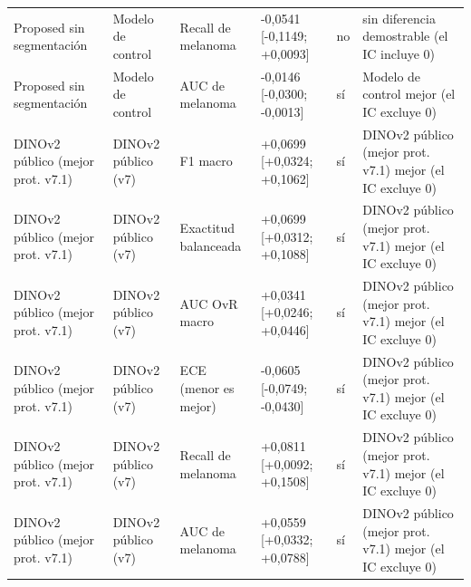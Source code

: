 \begin{longtable}{@{}llllll@{}}
Proposed sin segmentación & Modelo de control & Recall de melanoma & -0,0541 [-0,1149; +0,0093] & no & sin diferencia demostrable (el IC incluye 0) \\
Proposed sin segmentación & Modelo de control & AUC de melanoma & -0,0146 [-0,0300; -0,0013] & sí & Modelo de control mejor (el IC excluye 0) \\
DINOv2 público (mejor prot. v7.1) & DINOv2 público (v7) & F1 macro & +0,0699 [+0,0324; +0,1062] & sí & DINOv2 público (mejor prot. v7.1) mejor (el IC excluye 0) \\
DINOv2 público (mejor prot. v7.1) & DINOv2 público (v7) & Exactitud balanceada & +0,0699 [+0,0312; +0,1088] & sí & DINOv2 público (mejor prot. v7.1) mejor (el IC excluye 0) \\
DINOv2 público (mejor prot. v7.1) & DINOv2 público (v7) & AUC OvR macro & +0,0341 [+0,0246; +0,0446] & sí & DINOv2 público (mejor prot. v7.1) mejor (el IC excluye 0) \\
DINOv2 público (mejor prot. v7.1) & DINOv2 público (v7) & ECE (menor es mejor) & -0,0605 [-0,0749; -0,0430] & sí & DINOv2 público (mejor prot. v7.1) mejor (el IC excluye 0) \\
DINOv2 público (mejor prot. v7.1) & DINOv2 público (v7) & Recall de melanoma & +0,0811 [+0,0092; +0,1508] & sí & DINOv2 público (mejor prot. v7.1) mejor (el IC excluye 0) \\
DINOv2 público (mejor prot. v7.1) & DINOv2 público (v7) & AUC de melanoma & +0,0559 [+0,0332; +0,0788] & sí & DINOv2 público (mejor prot. v7.1) mejor (el IC excluye 0) \\
\bottomrule
\end{longtable}
\endgroup

